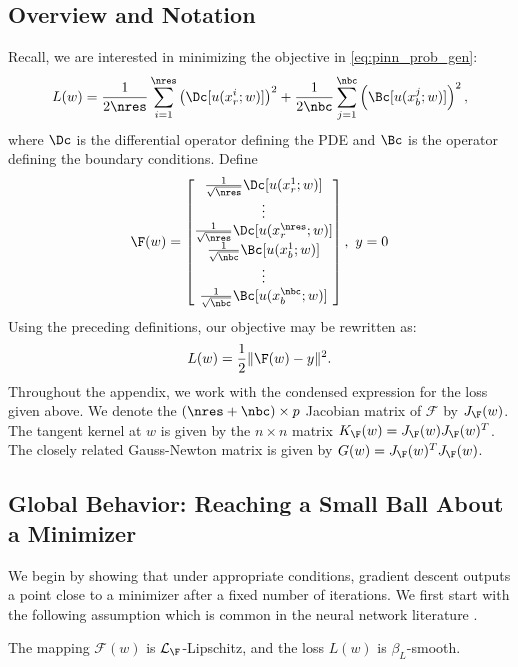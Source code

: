 \subsection{Overview and Notation}
Recall, we are interested in minimizing the objective in \eqref{eq:pinn_prob_gen}:
\[
L(w) = \frac{1}{2\nres}\sum_{i=1}^{\nres}\left(\Dc[u(x_r^i;w)]\right)^2+\frac{1}{2\nbc}\sum_{j=1}^{\nbc}\left(\Bc[u(x_b^j;w)]\right)^2, 
\]
where $\Dc$ is the differential operator defining the PDE and $\Bc$ is the operator defining the boundary conditions. 
Define
\[
\F(w) = \begin{bmatrix}
    \frac{1}{\sqrt{\nres}}\Dc[u(x^1_r;w)] \\
    \vdots \\
    \frac{1}{\sqrt{\nres}}\Dc[u(x_r^{\nres};w)]\\
    \frac{1}{\sqrt{\nbc}}\Bc[u(x^1_b;w)] \\
    \vdots \\
    \frac{1}{\sqrt{\nbc}}\Bc[u(x_b^{\nbc};w)]
\end{bmatrix},~ y = 0
\]
Using the preceding definitions, our objective may be rewritten as:
\[
L(w) = \frac{1}{2}\|\F(w)-y\|^2.
\]
Throughout the appendix, we work with the condensed expression for the loss given above.
We denote the $(\nres+\nbc)\times p$ Jacobian matrix of $\mathcal F$ by $J_\F(w)$. 
The tangent kernel at $w$ is given by the $n\times n$ matrix $K_\F(w) = J_\F(w) J_\F(w)^{T}$.
The closely related Gauss-Newton matrix is given by $G(w) = J_\F(w)^{T} J_\F(w)$.


\subsection{Global Behavior: Reaching a Small Ball About a Minimizer}
We begin by showing that under appropriate conditions, gradient descent outputs a point close to a minimizer after a fixed number of iterations.
We first start with the following assumption which is common in the neural network literature \cite{liu2022loss,liu2023aiming}.
\begin{assumption}
\label{assp:loss_reg}
     The mapping $\mathcal F(w)$ is $\mathcal L_\F$-Lipschitz, and the loss $L(w)$ is $\beta_{L}$-smooth.
\end{assumption}


